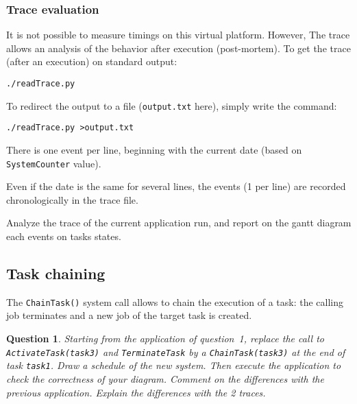 \documentclass[11pt]{report}
\newcommand{\namedtodo}[2][]{%
{%
\todo[color={yellow!50},size=\small]{%
\textbf{TODO [\uppercase{#1}]:}~#2}%
}}
\newtheorem{ex}{Question}
\begin{document}
%


\subsubsection{Trace evaluation}
%
It is not possible to measure timings on this virtual platform. However, The trace allows an analysis of the behavior after execution (post-mortem). To get the trace (after an execution) on standard output:

\begin{lstlisting}
./readTrace.py
\end{lstlisting}

To redirect the output to a file (\texttt{output.txt} here), simply write the command:
\begin{lstlisting}
./readTrace.py >output.txt
\end{lstlisting}


There is one event per line, beginning with the current date (based on \texttt{SystemCounter} value).

Even if the date is the same for several lines, the events (1 per line) are recorded chronologically in the trace file.

Analyze the trace of the current application run, and report on the gantt diagram each events on tasks states.

\subsection{Task chaining}

The \texttt{ChainTask()} system call allows to chain the execution of a task: the calling job terminates and a new job of the target task is created.

\begin{ex}
	Starting from the application of question~1, replace the call to \texttt{ActivateTask(task3)} and \texttt{TerminateTask} by a \texttt{ChainTask(task3)} at the end of task \texttt{task1}.
    Draw a schedule of the new system. Then execute the application to check the correctness of your diagram.
    Comment on the differences with the previous application. Explain the differences with the 2 traces.
\end{ex}
\end{document}
